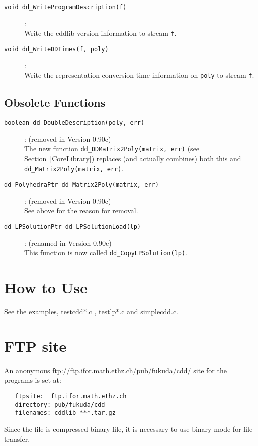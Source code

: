 \documentclass[11pt]{article}
\newcommand {\0} {{\bf 0}}
\begin{document}
\begin{description}
\item[{\tt void dd\_WriteProgramDescription(f)}]:\\
Write the cddlib version information to stream {\tt f}.

\item[{\tt void dd\_WriteDDTimes(f, poly)}]:\\
Write the representation conversion time information on {\tt poly}
 to stream {\tt f}.

\end{description}

\subsection{Obsolete Functions}  \label{ObsoleteFunctions}
\begin{description}
\item[{\tt boolean dd\_DoubleDescription(poly, err)}]: 
(removed in Version 0.90c)\\
The new function
{\tt dd\_DDMatrix2Poly(matrix, err)} (see Section~\ref{CoreLibrary}) 
replaces (and actually combines) both this and 
{\tt dd\_Matrix2Poly(matrix, err)}.

\item[{\tt dd\_PolyhedraPtr dd\_Matrix2Poly(matrix, err)}]: 
(removed in Version 0.90c)\\
See above for the reason for removal.

\item[{\tt dd\_LPSolutionPtr dd\_LPSolutionLoad(lp)}]:
(renamed in Version 0.90c)\\
This function is now called {\tt dd\_CopyLPSolution(lp)}.

\end{description}

\section{How to Use}  \label{HOWTO}

See the examples, testcdd*.c , testlp*.c and simplecdd.c.


\section{FTP site}  \label{FTP}
An anonymous 
{ftp://ftp.ifor.math.ethz.ch/pub/fukuda/cdd/} site for the programs is set at:
\begin{verbatim}
   ftpsite:  ftp.ifor.math.ethz.ch
   directory: pub/fukuda/cdd
   filenames: cddlib-***.tar.gz
\end{verbatim}
Since the file is compressed binary file, it is necessary to use binary mode for
file transfer.
\end{document}
